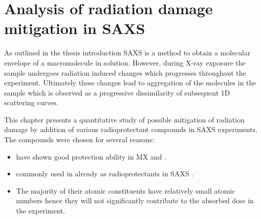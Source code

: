 \chapter{Analysis of radiation damage mitigation in SAXS}
\label{chap:Analysis of Radiation Damage in SAXS}

 As outlined in the thesis introduction SAXS is a method to obtain a molecular envelope of a macromolecule in solution.
 However, during X-ray exposure the sample undergoes radiation induced changes which progresses throughout the experiment.
 Ultimately these changes lead to aggregation of the molecules in the sample which is observed as a progressive dissimilarity of subsequent 1D scattering curves.

 This chapter presents a quantitative study of possible mitigation of radiation damage by addition of various radioprotectant compounds in SAXS experiments. The compounds were chosen for several reasons:
 \begin{itemize}
     \item have shown good protection ability in MX \cite{allan2012} and \cite{southworth2007radioprotectant}.
     \item commonly used in already as radioprotectants in SAXS \cite{grishaev2012sample}.
     \item The majority of their atomic constituents have relatively small atomic numbers hence they will not significantly contribute to the absorbed dose in the experiment.
 \end{itemize}
